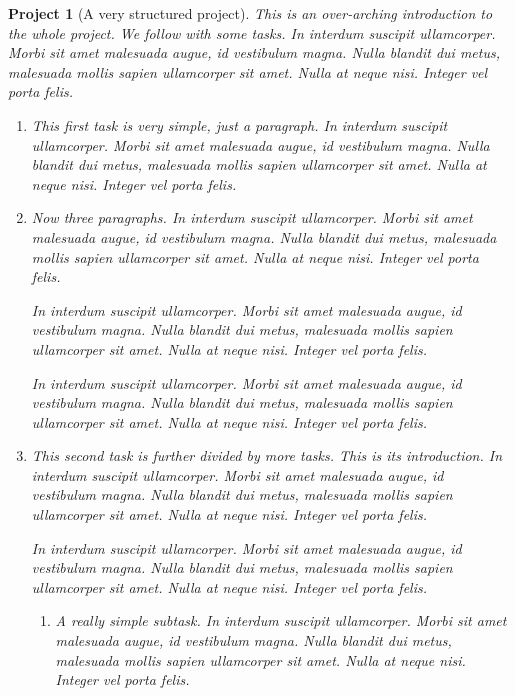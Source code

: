 \documentclass[pdflatex]{sn-jnl}
\theoremstyle{thmstyleone}%
\theoremstyle{thmstyletwo}%
\newtheorem{project}[theorem]{Project}
\theoremstyle{thmstylethree}%
\numberwithin{equation}{section}
\begin{document}
\begin{project}[A very structured project]\label{project-structured}%
%
This is an over-arching introduction to the whole project.  We follow with some tasks.  In interdum suscipit ullamcorper. Morbi sit amet malesuada augue, id vestibulum magna. Nulla blandit dui metus, malesuada mollis sapien ullamcorper sit amet. Nulla at neque nisi. Integer vel porta felis.%
\begin{enumerate}[font=\bfseries,label=(\alph*),ref=\alph*]%
\item{}This first task is very simple, just a paragraph.  In interdum suscipit ullamcorper. Morbi sit amet malesuada augue, id vestibulum magna. Nulla blandit dui metus, malesuada mollis sapien ullamcorper sit amet. Nulla at neque nisi. Integer vel porta felis.%
\item{}Now three paragraphs.  In interdum suscipit ullamcorper. Morbi sit amet malesuada augue, id vestibulum magna. Nulla blandit dui metus, malesuada mollis sapien ullamcorper sit amet. Nulla at neque nisi. Integer vel porta felis.%
\par
In interdum suscipit ullamcorper. Morbi sit amet malesuada augue, id vestibulum magna. Nulla blandit dui metus, malesuada mollis sapien ullamcorper sit amet. Nulla at neque nisi. Integer vel porta felis.%
\par
In interdum suscipit ullamcorper. Morbi sit amet malesuada augue, id vestibulum magna. Nulla blandit dui metus, malesuada mollis sapien ullamcorper sit amet. Nulla at neque nisi. Integer vel porta felis.%
\item{}This second task is further divided by more tasks.  This is its introduction.  In interdum suscipit ullamcorper. Morbi sit amet malesuada augue, id vestibulum magna. Nulla blandit dui metus, malesuada mollis sapien ullamcorper sit amet. Nulla at neque nisi. Integer vel porta felis.%
\par
In interdum suscipit ullamcorper. Morbi sit amet malesuada augue, id vestibulum magna. Nulla blandit dui metus, malesuada mollis sapien ullamcorper sit amet. Nulla at neque nisi. Integer vel porta felis.%
\begin{enumerate}[font=\bfseries,label=(\roman*),ref=\theenumi.\roman*]%
\item{}A really simple subtask.  In interdum suscipit ullamcorper. Morbi sit amet malesuada augue, id vestibulum magna. Nulla blandit dui metus, malesuada mollis sapien ullamcorper sit amet. Nulla at neque nisi. Integer vel porta felis.%
\par

\end{enumerate}
\end{enumerate}
\end{project}
\end{document}
